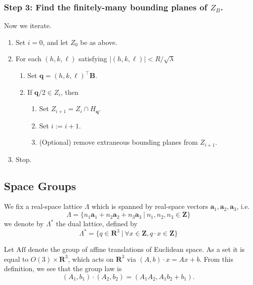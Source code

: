 \documentclass[11pt,a4paper]{article}
\def\v#1{\bm{{#1}}}
\def\tr{^\intercal}
\def\ba{\v{a}}
\def\q{{\v{q}}}
\begin{document}
\subsubsection{Step 3: Find the finitely-many bounding planes of $Z_B$.}

Now we iterate.
\begin{enumerate}
  \item Set $i = 0$, and let $Z_0$ be as above.
  \item For each $(h, k, \ell)$ satisfying $|(h,k,\ell)| < R/\sqrt\lambda$
    \begin{enumerate}
      \item Set $\q = (h,k,\ell)\tr\v{B}$.
      \item If $\q/2 \in Z_i$, then
        \begin{enumerate}
          \item Set $Z_{i+1} = Z_i \cap H_\q$.
          \item Set $i := i+1$.
          \item (Optional) remove extraneous bounding planes from $Z_{i+1}$.
        \end{enumerate}
    \end{enumerate}
  \item Stop.
\end{enumerate}


\subsection{Space Groups} \label{spacegroup}

We fix a real-space lattice $\Lambda$ which is spanned by real-space vectors $\ba_1, \ba_2, \ba_3$, i.e.
\begin{equation}
  \Lambda
  = \{ n_1 \ba_1 + n_2 \ba_2 + n_3 \ba_3 \ | \ n_1, n_2, n_3 \in \mathbf{Z} \}
\end{equation}
we denote by $\Lambda^\ast$ the dual lattice, defined by
\begin{equation}
  \Lambda^\ast
  = \{q \in \mathbf{R}^3 \ | \ \forall x \in \mathbf{Z}, q \cdot x \in \mathbf{Z} \}
\end{equation}

Let $\mathrm{Aff}$ denote the group of affine translations of Euclidean space. As a set it is equal to $O(3) \times \mathbf{R}^3$,
which acts on $\mathbf{R}^3$ via $(A, b) \cdot x = Ax + b$. From this definition, we see that the group law is
\begin{equation} (A_1, b_1) \cdot (A_2, b_2) = (A_1 A_2, A_1 b_2 + b_1). \end{equation}
\end{document}
